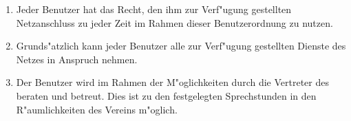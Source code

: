 
\begin{enumerate}
  \item Jeder Benutzer hat das Recht, den ihm zur Verf"ugung gestellten
      Netzanschluss zu jeder Zeit im Rahmen dieser Benutzerordnung zu
      nutzen.
  \item Grunds"atzlich kann jeder Benutzer alle zur Verf"ugung
      gestellten Dienste des Netzes in Anspruch nehmen.
  \item Der Benutzer wird im Rahmen der M"oglichkeiten durch die
      Vertreter des \snev beraten und betreut. Dies
      ist zu den festgelegten \glossar Sprechstunden in den R"aumlichkeiten des
      Vereins m"oglich.
\end{enumerate} 


